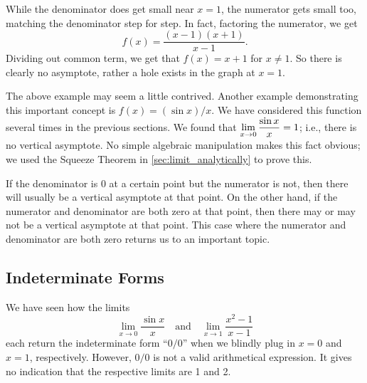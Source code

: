 
While the denominator does get small near $x=1$, the numerator gets small too, matching the denominator step for step. In fact, factoring the numerator, we get\vspace{-.5\baselineskip}
\[f(x)=\frac{(x-1)(x+1)}{x-1}.\]
Dividing out common term, we get that $f(x)=x+1$ for $x\not=1$.   So there is clearly no asymptote, rather a hole exists in the graph at $x=1$.\bigskip

The above example may seem a little contrived.  Another example demonstrating this important concept is $f(x)= (\sin x)/x$. We have considered this function several times in the previous sections. We found that $\displaystyle \lim_{x\to0}\frac{\sin x}{x}=1$; i.e., there is no vertical asymptote. No simple algebraic manipulation makes this fact obvious; we used the Squeeze Theorem in \autoref{sec:limit_analytically} to prove this.\bigskip

If the denominator is 0 at a certain point but the numerator is not, then there will usually be a vertical asymptote at that point. On the other hand, if the numerator and denominator are both zero at that point, then there may or may not be a vertical asymptote at that point.  This case where the numerator and denominator are both zero returns us to an important topic.

\subsection{Indeterminate Forms}

We have seen how the limits 
\[\lim_{x\rightarrow 0}\frac{\sin x}{x}\quad \text{and}\quad \lim_{x\to1}\frac{x^2-1}{x-1}\]
each return the indeterminate form ``$0/0$'' when we blindly plug in $x=0$ and $x=1$, respectively. However, $0/0$ is not a valid arithmetical expression. It gives no indication that the respective limits are 1 and 2.%

